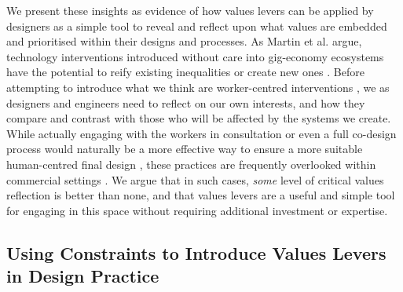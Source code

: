 We present these insights as evidence of how values levers can be applied by designers as a simple tool to reveal and reflect upon what values are embedded and prioritised within their designs and processes. As Martin et al. argue, technology interventions introduced without care into gig-economy ecosystems have the potential to reify existing inequalities or create new ones \cite{martin2016}. Before attempting to introduce what we think are worker-centred interventions \cite{carlos2021}, we as designers and engineers need to reflect on our own interests, and how they compare and contrast with those who will be affected by the systems we create. While actually engaging with the workers in consultation or even a full co-design process would naturally be a more effective way to ensure a more suitable human-centred final design \citep{maguire2001}, these practices are frequently overlooked within commercial settings \cite{Ardito2014, Shilton2013}. We argue that in such cases, \textit{some} level of critical values reflection is better than none, and that values levers are a useful and simple tool for engaging in this space without requiring additional investment or expertise.

\subsection{Using Constraints to Introduce Values Levers in Design Practice}


